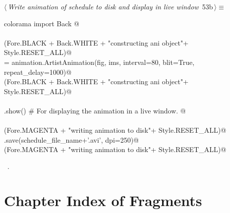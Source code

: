 \documentclass[11.5pt]{report}
\begin{document}
\vspace{-0.8cm} \newchunk


\begin{flushleft} \small\label{scrap77}\raggedright\small
{} $\langle\,${\itshape Write animation of schedule to disk and display in live window}\nobreak\ {\footnotesize {53b}}$\,\rangle\equiv$
\vspace{-1ex}
\begin{list}{}{} \item
\mbox{}\verb@from colorama import Back @\\
\mbox{}\verb@@\\
\mbox{}\verb@debug(Fore.BLACK + Back.WHITE + "\nStarted constructing ani object"+ Style.RESET_ALL)@\\
\mbox{}\verb@ani = animation.ArtistAnimation(fig, ims, interval=80, blit=True, repeat_delay=1000)@\\
\mbox{}\verb@debug(Fore.BLACK + Back.WHITE + "\nFinished constructing ani object"+ Style.RESET_ALL)@\\
\mbox{}\verb@@\\
\mbox{}\verb@plt.show() # For displaying the animation in a live window. @\\
\mbox{}\verb@@\\
\mbox{}\verb@debug(Fore.MAGENTA + "\nStarted writing animation to disk"+ Style.RESET_ALL)@\\
\mbox{}\verb@ani.save(schedule_file_name+'.avi', dpi=250)@\\
\mbox{}\verb@debug(Fore.MAGENTA + "\nFinished writing animation to disk"+ Style.RESET_ALL)@\\
\mbox{}\verb@@{\NWsep}
\end{list}
\vspace{-1.5ex}
\footnotesize
\begin{list}{}{\setlength{\itemsep}{-\parsep}\setlength{\itemindent}{-\leftmargin}}
\item \NWtxtMacroRefIn\ .

\item{}
\end{list}
\vspace{4ex}
\end{flushleft}

\section{Chapter Index of Fragments}
\end{document}
